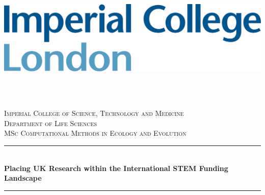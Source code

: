 \documentclass[12pt]{article}
\begin{document}
\begin{titlepage}

\newcommand{\HRule}{\rule{\linewidth}{0.5mm}} %
\setlength{\topmargin}{0in}
\center %
 
 
 \begin{minipage}{0.4\textwidth}
\begin{flushleft} \large
\hspace*{-0.5cm}
\includegraphics[scale=0.14]{imperial.png}\\
\end{flushleft}
\end{minipage}
~
\begin{minipage}{0.5\textwidth}
\begin{flushright} \large
\hspace*{2cm}
\end{flushright}
\end{minipage}\\[1cm]

\textsc{\LARGE Imperial College of Science, Technology and Medicine}\\[1.5cm] 
\textsc{\Large Department of Life Sciences}\\[0.5cm]
\textsc{\large MSc Computational Methods in Ecology and Evolution}\\[0.5cm]


\HRule \\[0.4cm]
{ \huge \bfseries Placing UK Research within the International STEM Funding Landscape}\\[0.4cm] 
\HRule \\[1cm]
 


\end{titlepage}
\end{document}
